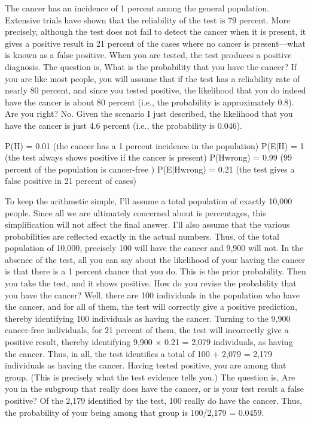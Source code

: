 The cancer has an incidence of 1 percent among the general population. Extensive trials have shown that the reliability of the test is 79 percent. More precisely, although the test does not fail to detect the cancer when it is present, it gives a positive result in 21 percent of the cases where no cancer is present—what is known as a false positive. When you are tested, the test produces a positive diagnosis. The question is, What is the probability that you have the cancer? If you are like most people, you will assume that if the test has a reliability rate of nearly 80 percent, and since you tested positive, the likelihood that you do indeed have the cancer is about 80 percent (i.e., the probability is approximately 0.8). Are you right? No. Given the scenario I just described, the likelihood that you have the cancer is just 4.6 percent (i.e., the probability is 0.046).

P(H) = 0.01 (the cancer has a 1 percent incidence in the population) P(E|H) = 1 (the test always shows positive if the cancer is present) P(Hwrong) = 0.99 (99 percent of the population is cancer-free ) P(E|Hwrong) = 0.21 (the test gives a false positive in 21 percent of cases)

To keep the arithmetic simple, I’ll assume a total population of exactly 10,000 people. Since all we are ultimately concerned about is percentages, this simplification will not affect the final answer. I’ll also assume that the various probabilities are reflected exactly in the actual numbers. Thus, of the total population of 10,000, precisely 100 will have the cancer and 9,900 will not. In the absence of the test, all you can say about the likelihood of your having the cancer is that there is a 1 percent chance that you do. This is the prior probability. Then you take the test, and it shows positive. How do you revise the probability that you have the cancer? Well, there are 100 individuals in the population who have the cancer, and for all of them, the test will correctly give a positive prediction, thereby identifying 100 individuals as having the cancer. Turning to the 9,900 cancer-free individuals, for 21 percent of them, the test will incorrectly give a positive result, thereby identifying 9,900 × 0.21 = 2,079 individuals, as having the cancer. Thus, in all, the test identifies a total of 100 + 2,079 = 2,179 individuals as having the cancer. Having tested positive, you are among that group. (This is precisely what the test evidence tells you.) The question is, Are you in the subgroup that really does have the cancer, or is your test result a false positive? Of the 2,179 identified by the test, 100 really do have the cancer. Thus, the probability of your being among that group is 100/2,179 = 0.0459.


